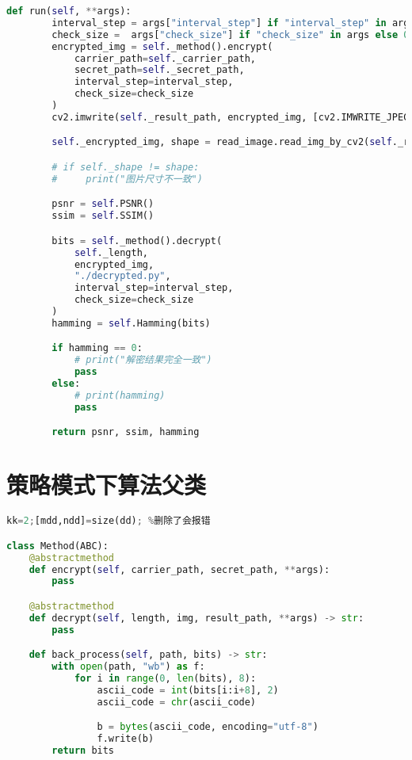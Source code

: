 \documentclass[a4paper,zihao=5,UTF8]{ctexart}
\begin{document}
\begin{lstlisting}[language=Python]
    def run(self, **args):
        interval_step = args["interval_step"] if "interval_step" in args else 0
        check_size =  args["check_size"] if "check_size" in args else 0
        encrypted_img = self._method().encrypt(
            carrier_path=self._carrier_path,
            secret_path=self._secret_path,
            interval_step=interval_step,
            check_size=check_size
        )
        cv2.imwrite(self._result_path, encrypted_img, [cv2.IMWRITE_JPEG_QUALITY, 89])

        self._encrypted_img, shape = read_image.read_img_by_cv2(self._result_path)

        # if self._shape != shape:
        #     print("图片尺寸不一致")

        psnr = self.PSNR()
        ssim = self.SSIM()

        bits = self._method().decrypt(
            self._length, 
            encrypted_img,
            "./decrypted.py",
            interval_step=interval_step,
            check_size=check_size
        )
        hamming = self.Hamming(bits)

        if hamming == 0:
            # print("解密结果完全一致")
            pass
        else:
            # print(hamming)
            pass

        return psnr, ssim, hamming

\end{lstlisting}

\section{策略模式下算法父类}

\begin{lstlisting}[language=Python]%设置不同语言即可。
kk=2;[mdd,ndd]=size(dd); %删除了会报错

class Method(ABC):
    @abstractmethod
    def encrypt(self, carrier_path, secret_path, **args):
        pass

    @abstractmethod
    def decrypt(self, length, img, result_path, **args) -> str:
        pass

    def back_process(self, path, bits) -> str:
        with open(path, "wb") as f:
            for i in range(0, len(bits), 8):
                ascii_code = int(bits[i:i+8], 2)
                ascii_code = chr(ascii_code)

                b = bytes(ascii_code, encoding="utf-8")
                f.write(b)
        return bits

\end{lstlisting}
\end{document}
